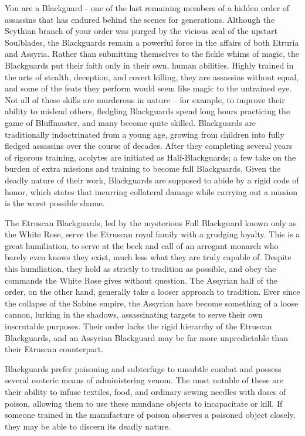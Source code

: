 \documentclass[blue]{Kos}
\begin{document}
\name{\bBlackguards{}}

You are a Blackguard - one of the last remaining members of a hidden order of assassins that has endured behind the scenes for generations. Although the Scythian branch of your order was purged by the vicious zeal of the upstart Soulblades, the Blackguards remain a powerful force in the affairs of both Etruria and Assyria. Rather than submitting themselves to the fickle whims of magic, the Blackguards put their faith only in their own, human abilities. Highly trained in the arts of stealth, deception, and covert killing, they are assassins without equal, and some of the feats they perform would seem like magic to the untrained eye. Not all of these skills are murderous in nature – for example, to improve their ability to mislead others, fledgling Blackguards spend long hours practicing the game of Bluffmaster, and many become quite skilled. Blackguards are traditionally indoctrinated from a young age, growing from children into fully fledged assassins over the course of decades. After they completing several years of rigorous training, acolytes are initiated as Half-Blackguards; a few take on the burden of extra missions and training to become full Blackguards. Given the deadly nature of their work, Blackguards are supposed to abide by a rigid code of honor, which states that incurring  collateral damage  while carrying out a mission is the worst possible shame. 

The Etruscan Blackguards, led by the mysterious Full Blackguard known only as the White Rose, serve the Etruscan royal family with a grudging loyalty. This is a great humiliation, to serve at the beck and call of an arrogant monarch who barely even knows they exist, much less what they are truly capable of. Despite this humiliation, they hold as strictly to tradition as possible, and obey the commands the White Rose gives without question. The Assyrian half of the order, on the other hand, generally take a looser approach to tradition. Ever since the collapse of the Sabine empire, the Assyrian have become something of a loose cannon, lurking in the shadows, assassinating targets to serve their own inscrutable purposes. Their order lacks the rigid hierarchy of the Etruscan Blackguards, and an Assyrian Blackguard may be far more unpredictable than their Etruscan counterpart. 

Blackguards prefer poisoning and subterfuge to unsubtle combat and possess several esoteric means of administering venom. The most notable of these are their ability to infuse textiles, food, and ordinary sewing needles with doses of poison, allowing them to use these mundane objects to incapacitate or kill. If someone trained in the manufacture of poison observes a poisoned object closely, they may be able to discern its deadly nature. 
\end{document}
